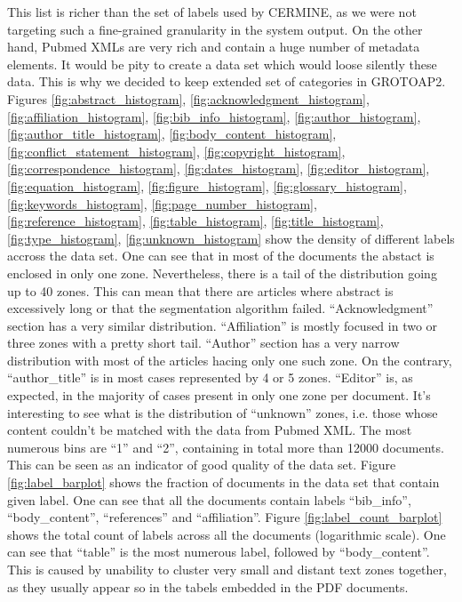 This list is richer than the set of labels used by CERMINE, as we were not targeting such a fine-grained granularity in the system output. On the other hand, Pubmed XMLs are very rich and contain a huge number of metadata elements. It would be pity to create a data set which would loose silently these data. This is why we decided to keep extended set of categories in GROTOAP2.
Figures \ref{fig:abstract_histogram}, \ref{fig:acknowledgment_histogram}, \ref{fig:affiliation_histogram}, \ref{fig:bib_info_histogram}, \ref{fig:author_histogram}, \ref{fig:author_title_histogram}, \ref{fig:body_content_histogram}, \ref{fig:conflict_statement_histogram}, \ref{fig:copyright_histogram}, \ref{fig:correspondence_histogram}, \ref{fig:dates_histogram}, \ref{fig:editor_histogram}, \ref{fig:equation_histogram}, \ref{fig:figure_histogram}, \ref{fig:glossary_histogram}, \ref{fig:keywords_histogram}, \ref{fig:page_number_histogram}, \ref{fig:reference_histogram}, \ref{fig:table_histogram}, \ref{fig:title_histogram}, \ref{fig:type_histogram}, \ref{fig:unknown_histogram} show the density of different labels accross the data set. One can see that in most of the documents the abstact is enclosed in only one zone. Nevertheless, there is a tail of the distribution going up to 40 zones. This can mean that there are articles where abstract is excessively long or that the segmentation algorithm failed. ``Acknowledgment'' section has a very similar distribution. ``Affiliation'' is mostly focused in two or three zones with a pretty short tail. ``Author'' section has a very narrow distribution with most of the articles hacing only one such zone. On the contrary, ``author\_title'' is in most cases represented by 4 or 5 zones. ``Editor'' is, as expected, in the majority of cases present in only one zone per document. It's interesting to see what is the distribution of ``unknown'' zones, i.e. those whose content couldn't be matched with the data from Pubmed XML. The most numerous bins are ``1'' and ``2'', containing in total more than 12000 documents. This can be seen as an indicator of good quality of the data set.
\quad
Figure \ref{fig:label_barplot} shows the fraction of documents in the data set that contain given label. One can see that all the documents contain labels ``bib\_info'', ``body\_content'', ``references'' and ``affiliation''.
\quad
Figure \ref{fig:label_count_barplot} shows the total count of labels across all the documents (logarithmic scale). One can see that ``table'' is the most numerous label, followed by ``body\_content''. This is caused by unability to cluster very small and distant text zones together, as they usually appear so in the tabels embedded in the PDF documents.
